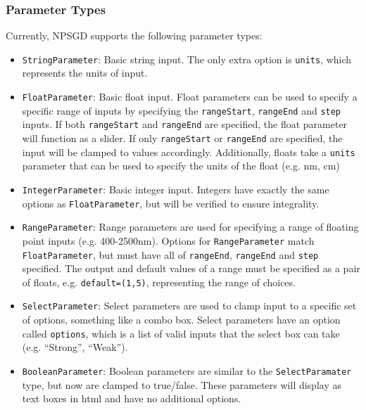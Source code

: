 \documentclass{article}
\begin{document}
\subsubsection{Parameter Types}
\label{sec:ParameterTypes}
Currently, NPSGD supports the following parameter types:
\begin{itemize}
    \item \texttt{StringParameter}: Basic string input. The only extra option is
              \texttt{units}, which represents the units of input.

    \item \texttt{FloatParameter}: Basic float input. Float parameters can be
              used to specify a specific range of inputs by specifying the
              \texttt{rangeStart}, \texttt{rangeEnd} and \texttt{step} inputs. If both
              \texttt{rangeStart} and \texttt{rangeEnd} are specified, the float
              parameter will function as a slider. If only \texttt{rangeStart} or
              \texttt{rangeEnd} are specified, the input will be clamped to values
              accordingly. Additionally, floats take a \texttt{units} parameter that
              can be used to specify the units of the float (e.g. nm, cm)

    \item \texttt{IntegerParameter}: Basic integer input. Integers have exactly
              the same options as \texttt{FloatParameter}, but will be verified to
              ensure integrality.

    \item \texttt{RangeParameter}: Range parameters are used for specifying a
              range of floating point inputs (e.g. 400-2500nm). Options for
              \texttt{RangeParameter} match \texttt{FloatParameter}, but must
              have all of \texttt{rangeEnd}, \texttt{rangeEnd} and \texttt{step}
              specified. The output and default values of a range must be
              specified as a pair of floats, e.g. \texttt{default=(1,5)},
              representing the range of choices.

    \item \texttt{SelectParameter}: Select parameters are used to clamp input to
              a specific set of options, something like a combo box. Select
              parameters have an option called \texttt{options}, which is a list
              of valid inputs that the select box can take (e.g. ``Strong'',
              ``Weak'').

    \item \texttt{BooleanParameter}: Boolean parameters are similar to the
              \texttt{SelectParamater} type, but now are clamped to true/false. 
              These parameters will display as text boxes in html and have no
              additional options.
\end{itemize}
\end{document}

